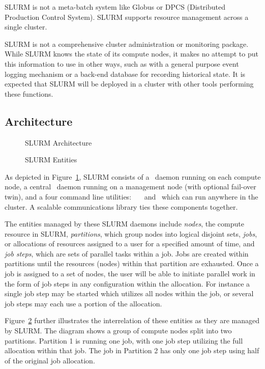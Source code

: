 SLURM is not a meta-batch system like Globus or DPCS (Distributed Production 
Control System).  SLURM supports resource management across a single cluster.

SLURM is not a comprehensive cluster administration or monitoring package.  
While SLURM knows the state of its compute nodes, it makes no attempt to put
this information to use in other ways, such as with a general purpose event
logging mechanism or a back-end database for recording historical state.
It is expected that SLURM will be deployed in a cluster with other 
tools performing these functions. 

\subsection{Architecture}


\begin{figure}[tb]
\centerline{}
\caption{SLURM Architecture}
\label{arch}
\end{figure}

\begin{figure}[tcb]
\centerline{}
\caption{SLURM Entities}
\label{entities}
\end{figure}


As depicted in Figure~\ref{arch}, SLURM consists of a \slurmd\ daemon
running on each compute node, a central \slurmctld\ daemon running on
a management node (with optional fail-over twin), and a four command line
utilities: \srun\, \scancel\, \squeue\, and \scontrol\,
which can run anywhere in the cluster.  A scalable communications library
ties these components together.

The entities managed by these SLURM daemons include {\em nodes}, the
compute resource in SLURM, {\em partitions}, which group nodes into
logical disjoint sets, {\em jobs}, or allocations of resources assigned
to a user for a specified amount of time, and {\em job steps}, which are
sets of parallel tasks within a job.  Jobs are created within partitions
until the resources (nodes) within that partition are exhausted. Once
a job is assigned to a set of nodes, the user will be able to initiate
parallel work in the form of job steps in any configuration within the
allocation. For instance a single job step may be started which utilizes
all nodes within the job, or several job steps may each use a portion
of the allocation.

Figure~\ref{entities} further illustrates the interrelation of these
entities as they are managed by SLURM. The diagram shows a group of
compute nodes split into two partitions. Partition 1 is running one
job, with one job step utilizing the full allocation within that job.
The job in Partition 2 has only one job step using half of the original
job allocation.

